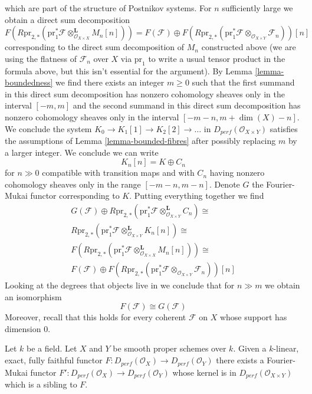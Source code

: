 which are part of the structure of Postnikov systems.
For $n$ sufficiently large we obtain a direct sum decomposition
$$
F(R\text{pr}_{2, *}(\text{pr}_1^*\mathcal{F}
\otimes^\mathbf{L}_{\mathcal{O}_{X \times X}} M_n[n]))
=
F(\mathcal{F}) \oplus
F(R\text{pr}_{2, *}(
\text{pr}_1^*\mathcal{F} \otimes_{\mathcal{O}_{X \times Y}} \mathcal{F}_n
))[n]
$$
corresponding to the direct sum decomposition of $M_n$ constructed above
(we are using the flatness of $\mathcal{F}_n$ over $X$ via $\text{pr}_1$
to write a usual tensor product in the formula above, but this isn't
essential for the argument).
By Lemma \ref{lemma-boundedness} we find there exists an integer $m \geq 0$
such that the first summand in this direct sum decomposition has nonzero
cohomology sheaves only in the interval $[-m, m]$ and the
second summand in this direct sum decomposition has nonzero cohomology
sheaves only in the interval $[-m - n, m + \dim(X) - n]$.
We conclude the system $K_0 \to K_1[1] \to K_2[2] \to \ldots$
in $D_{perf}(\mathcal{O}_{X \times Y})$ satisfies the assumptions of
Lemma \ref{lemma-bounded-fibres} after possibly replacing $m$ by
a larger integer. We conclude we can write
$$
K_n[n] = K \oplus C_n
$$
for $n \gg 0$ compatible with transition maps and with $C_n$
having nonzero cohomology sheaves only in the range $[-m - n, m - n]$.
Denote $G$ the Fourier-Mukai functor corresponding to $K$.
Putting everything together we find
$$
\begin{matrix}
G(\mathcal{F}) \oplus
R\text{pr}_{2, *}(
\text{pr}_1^*\mathcal{F} \otimes_{\mathcal{O}_{X \times Y}}^\mathbf{L} C_n)
\cong \\
R\text{pr}_{2, *}(\text{pr}_1^*\mathcal{F}
\otimes^\mathbf{L}_{\mathcal{O}_{X \times Y}} K_n[n]) \cong \\
F(R\text{pr}_{2, *}(\text{pr}_1^*\mathcal{F}
\otimes^\mathbf{L}_{\mathcal{O}_{X \times X}} M_n[n]))
\cong \\
F(\mathcal{F}) \oplus
F(R\text{pr}_{2, *}(
\text{pr}_1^*\mathcal{F} \otimes_{\mathcal{O}_{X \times Y}} \mathcal{F}_n
))[n]
\end{matrix}
$$
Looking at the degrees that objects live in we conclude that for $n \gg m$
we obtain an isomorphism
$$
F(\mathcal{F}) \cong G(\mathcal{F})
$$
Moreover, recall that this holds for every coherent $\mathcal{F}$ on $X$
whose support has dimension $0$.

\begin{lemma}
\label{lemma-fully-faithful}
Let $k$ be a field. Let $X$ and $Y$ be smooth proper schemes over $k$.
Given a $k$-linear, exact, fully faithful functor
$F : D_{perf}(\mathcal{O}_X) \to D_{perf}(\mathcal{O}_Y)$
there exists a Fourier-Mukai functor
$F' : D_{perf}(\mathcal{O}_X) \to D_{perf}(\mathcal{O}_Y)$ whose kernel
is in $D_{perf}(\mathcal{O}_{X \times Y})$ which is a sibling to $F$.
\end{lemma}

